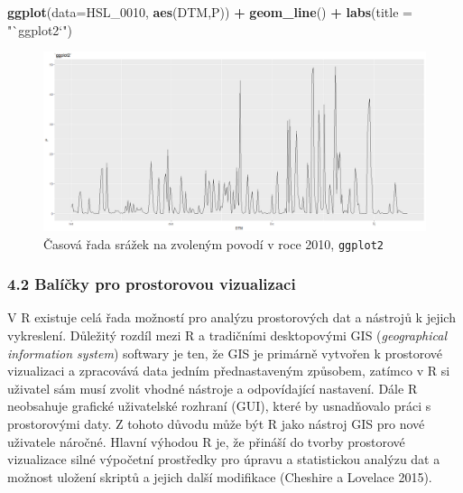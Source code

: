 \documentclass[12pt,]{article}
\newenvironment{Shaded}{\begin{snugshade}}{\end{snugshade}}
\newcommand{\KeywordTok}[1]{\textcolor[rgb]{0.13,0.29,0.53}{\textbf{#1}}}
\newcommand{\DataTypeTok}[1]{\textcolor[rgb]{0.13,0.29,0.53}{#1}}
\newcommand{\DecValTok}[1]{\textcolor[rgb]{0.00,0.00,0.81}{#1}}
\newcommand{\StringTok}[1]{\textcolor[rgb]{0.31,0.60,0.02}{#1}}
\newcommand{\OperatorTok}[1]{\textcolor[rgb]{0.81,0.36,0.00}{\textbf{#1}}}
\newcommand{\NormalTok}[1]{#1}
\begin{document}
\begin{Shaded}
\begin{Highlighting}[]
\KeywordTok{ggplot}\NormalTok{(}\DataTypeTok{data=}\NormalTok{HSL_}\DecValTok{0010}\NormalTok{, }\KeywordTok{aes}\NormalTok{(DTM,P)) }\OperatorTok{+}\StringTok{ }
\StringTok{  }\KeywordTok{geom_line}\NormalTok{() }\OperatorTok{+}\StringTok{ }
\StringTok{  }\KeywordTok{labs}\NormalTok{(}\DataTypeTok{title =} \StringTok{"`ggplot2`"}\NormalTok{)}
\end{Highlighting}
\end{Shaded}

\begin{figure}[H]
      \includegraphics[width=\textwidth]{fig/3ggplot}
      \caption{Časová řada srážek na zvoleným povodí v roce 2010, \texttt{ggplot2}}
      \label{fig:ch4.1c}
\end{figure}

\subsubsection{4.2 Balíčky pro prostorovou
vizualizaci}\label{balicky-pro-prostorovou-vizualizaci}

\qquad V R existuje celá řada možností pro analýzu prostorových dat a
nástrojů k jejich vykreslení. Důležitý rozdíl mezi R a tradičními
desktopovými GIS (\emph{geographical information system}) softwary je
ten, že GIS je primárně vytvořen k prostorové vizualizaci a zpracovává
data jedním přednastaveným způsobem, zatímco v R si uživatel sám musí
zvolit vhodné nástroje a odpovídající nastavení. Dále R neobsahuje
grafické uživatelské rozhraní (GUI), které by usnadňovalo práci s
prostorovými daty. Z tohoto důvodu může být R jako nástroj GIS pro nové
uživatele náročné. Hlavní výhodou R je, že přináší do tvorby prostorové
vizualizace silné výpočetní prostředky pro úpravu a statistickou analýzu
dat a možnost uložení skriptů a jejich další modifikace (Cheshire a
Lovelace 2015).
\end{document}
